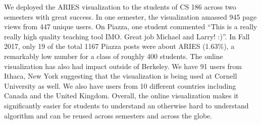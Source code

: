 \documentclass[12pt]{article}
\begin{document}
We deployed the ARIES visualization to the students of CS 186 across two
semesters with great success. In one semester, the visualization amassed 945
page views from 447 unique users. On Piazza, one student commented ``This is a
really really high quality teaching tool IMO. Great job Michael and Larry!
:)''. In Fall 2017, only 19 of the total 1167 Piazza posts were about ARIES
(1.63\%), a remarkably low number for a class of roughly 400 students. The
online visualization has also had impact outside of Berkeley. We have 91 users
from Ithaca, New York suggesting that the visualization is being used at
Cornell University as well. We also have users from 10 different countries
including Canada and the United Kingdom. Overall, the online visualization
makes it significantly easier for students to understand an otherwise hard to
understand algorithm and can be reused across semesters and across the globe.

{
  \footnotesize
  
  
}
\end{document}
